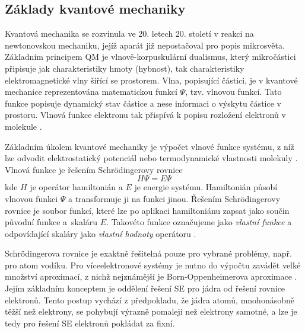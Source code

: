 \subsection{Základy kvantové mechaniky}
Kvantová mechanika se rozvinula ve 20. letech 20. století v reakci na newtonovskou mechaniku, jejíž aparát již nepostačoval pro popis mikrosvěta.  Základním principem QM je vlnově-korpuskulární dualismus, který mikročástici připisuje jak charakteristiky hmoty (hybnost), tak charakteristiky elektromagnetické vlny šířící se prostorem.
Vlna, popisující částici, je v kvantové mechanice reprezentována matematickou funkcí $\Psi$, tzv. vlnovou funkcí. Tato funkce popisuje dynamický stav částice a nese informaci o výskytu částice v prostoru. Vlnová funkce elektronu tak přispívá k popisu rozložení elektronů v molekule \cite{Cely}. 

Základním úkolem kvantové mechaniky je výpočet vlnové funkce systému, z níž lze odvodit elektrostatický potenciál \cite{elstat_pot} nebo termodynamické vlastnosti molekuly \cite{td}. Vlnová funkce je řešením Schrödingerovy rovnice
\begin{equation}
    H\Psi = E\Psi
\end{equation}
kde $H$ je operátor hamiltonián a $E$ je energie systému. Hamiltonián působí vlnovou funkci $\Psi$ a transformuje ji na funkci jinou. Řešením Schrödingerovy rovnice je soubor funkcí, které lze po aplikaci hamiltoniánu zapsat jako součin původní funkce a~skaláru $E$. Takovéto funkce označujeme jako \textit{vlastní funkce} a odpovídající skaláry jako \textit{vlastní hodnoty} operátoru \cite{Volatron}. 
 
 Schrödingerova rovnice je exaktně řešitelná pouze pro vybrané problémy, např. pro atom vodíku. Pro víceelektronové systémy je nutno do výpočtu zavádět velké množství aproximací, z nichž nejznámější je Born-Oppenheimerova aproximace \cite{BO_approx_Pilar}. %
 Jejím základním konceptem je oddělení řešení SE pro jádra od řešení rovnice elektronů. Tento postup vychází z předpokladu, že jádra atomů, mnohonásobně těžší než elektrony,
 se pohybují výrazně pomaleji než elektrony samotné, a lze je tedy pro řešení SE elektronů pokládat za fixní. %
 
